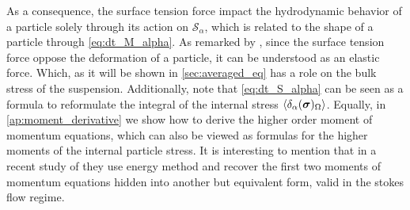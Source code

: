 As a consequence, the surface tension force impact the hydrodynamic behavior of a particle solely through its action on $\mathcal{S}_\alpha$, which is related to the shape of a particle through \ref{eq:dt_M_alpha}.
As remarked by \citet{batchelor1970stress}, since the surface tension force oppose the deformation of a particle, it can be understood as an elastic force. 
Which, as it will be shown in \ref{sec:averaged_eq} has a role on the bulk stress of the suspension. 
Additionally, note that \ref{eq:dt_S_alpha} can be seen as a formula to reformulate the integral of the internal stress $\left<\delta_\alpha ( \bm{\sigma} )_{\Omega}\right>$.
Equally, in \ref{ap:moment_derivative} we show how to derive the higher order moment of momentum equations, which can also be viewed as formulas for the higher moments of the internal particle stress. 
It is interesting to mention that in a recent study of \citet{dolata2021faxen} they use energy method and recover the first two moments of momentum equations hidden into another but equivalent form, valid in the stokes flow regime. 


